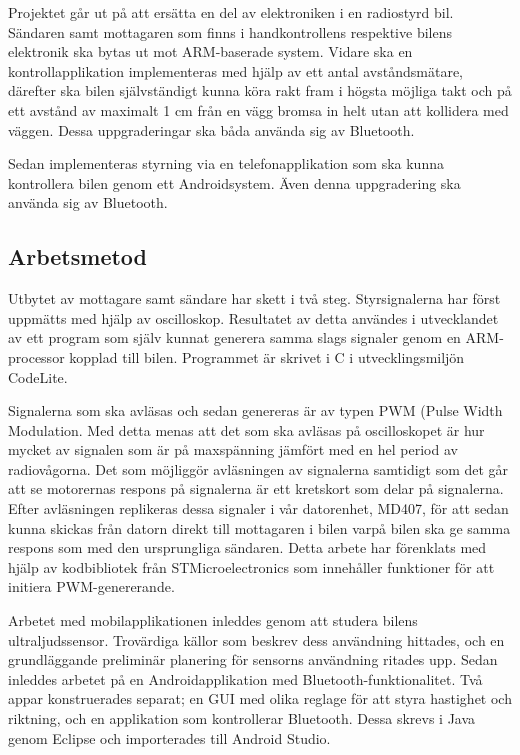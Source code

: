 \documentclass[a4paper]{article}
\begin{document}
Projektet går ut på att ersätta en del av elektroniken i en radiostyrd bil. Sändaren samt mottagaren som finns i handkontrollens respektive bilens elektronik ska bytas ut mot ARM-baserade system. Vidare ska en kontrollapplikation implementeras med hjälp av ett antal avståndsmätare, därefter ska bilen självständigt kunna köra rakt fram i högsta möjliga takt och på ett avstånd av maximalt 1 cm från en vägg bromsa in helt utan att kollidera med väggen. Dessa uppgraderingar ska båda använda sig av Bluetooth. 

\vspace{5mm} \noindent
Sedan implementeras styrning via en telefonapplikation som ska kunna kontrollera bilen genom ett Androidsystem. Även denna uppgradering ska använda sig av Bluetooth.

\subsection{Arbetsmetod}

Utbytet av mottagare samt sändare har skett i två steg. Styrsignalerna har först uppmätts med hjälp av oscilloskop. Resultatet av detta användes i utvecklandet av ett program som själv kunnat generera samma slags signaler genom en ARM-processor kopplad till bilen. Programmet är skrivet i C i utvecklingsmiljön CodeLite.

\vspace{5mm} \noindent
Signalerna som ska avläsas och sedan genereras är av typen PWM (Pulse Width Modulation. Med detta menas att det som ska avläsas på oscilloskopet är hur mycket av signalen som är på maxspänning jämfört med en hel period av radiovågorna. Det som möjliggör avläsningen av signalerna samtidigt som det går att se motorernas respons på signalerna är ett kretskort som delar på signalerna. Efter avläsningen replikeras dessa signaler i vår datorenhet, MD407, för att sedan kunna skickas från datorn direkt till mottagaren i bilen varpå bilen ska ge samma respons som med den ursprungliga sändaren. Detta arbete har förenklats med hjälp av kodbibliotek från STMicroelectronics som innehåller funktioner för att initiera PWM-genererande. 

\vspace{5mm} \noindent
Arbetet med mobilapplikationen inleddes genom att studera bilens ultraljudssensor. Trovärdiga källor som beskrev dess användning hittades, och en grundläggande preliminär planering för sensorns användning ritades upp. Sedan inleddes arbetet på en Androidapplikation med Bluetooth-funktionalitet.
Två appar konstruerades separat; en GUI med olika reglage för att styra hastighet och riktning, och en applikation som kontrollerar Bluetooth. Dessa skrevs i Java genom Eclipse och importerades till Android Studio.
\end{document}
